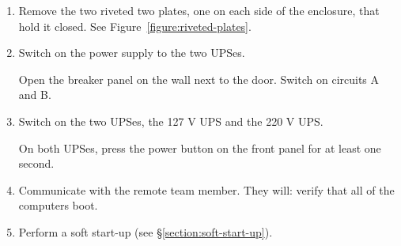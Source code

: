 \begin{enumerate}
\item
Remove the two riveted two plates, one on each side of the enclosure, that hold it closed. See Figure~\ref{figure:riveted-plates}.

\item Switch on the power supply to the two UPSes.

Open the breaker panel on the wall next to the door. Switch on circuits A and B.

\item Switch on the two UPSes, the 127 V UPS and the 220 V UPS.

On both UPSes, press the power button on the front panel for at least one second.

\item Communicate with the remote team member. They will:
verify that all of the computers boot.

\item Perform a soft start-up (see \S\ref{section:soft-start-up}).

\end{enumerate}